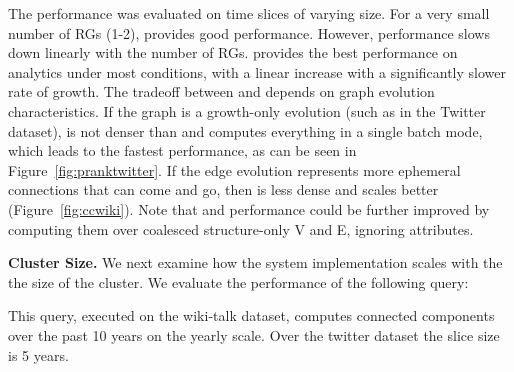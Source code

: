 The performance was evaluated on time slices of varying size.  For a
very small number of RGs (1-2), \sg provides good performance.
However, \sg performance slows down linearly with the number of RGs.
\hg provides the best performance on analytics under most conditions,
with a linear increase with a significantly slower rate of growth.
The tradeoff between \og and \hg depends on graph evolution
characteristics.  If the graph is a growth-only evolution (such as in
the Twitter dataset), \og is not denser than \hg and computes
everything in a single batch mode, which leads to the fastest
performance, as can be seen in Figure~\ref{fig:pranktwitter}.  If the
edge evolution represents more ephemeral connections that can come and
go, then \hg is less dense and scales better
(Figure~\ref{fig:ccwiki}).  Note that \og and \hg performance could be
further improved by computing them over coalesced structure-only V and
E, ignoring attributes.

{\bf Cluster Size.}  We next examine how the system implementation
scales with the the size of the cluster.  We evaluate the performance
of the following query:


This query, executed on the wiki-talk dataset, computes connected
components over the past 10 years on the yearly scale.  Over the
twitter dataset the slice size is 5 years.


